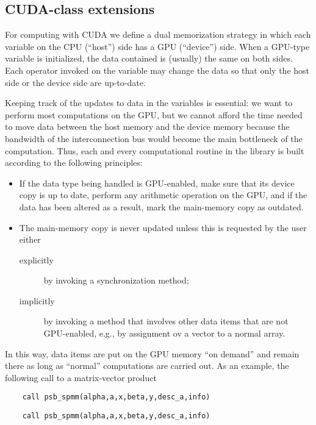 
\subsection{CUDA-class extensions}

For computing  with CUDA we define a dual memorization strategy in
which each variable on the CPU (``host'') side has a GPU (``device'')
side. When a GPU-type variable is initialized, the data contained is
(usually) the same on both sides. Each operator invoked on the
variable may change the data so that only the host side or the device
side are up-to-date. 

Keeping track of the updates to data in the variables  is essential: we want
to perform most  computations on the GPU, but we cannot afford the time
needed to move data between the host  memory and the device memory
because the bandwidth of the interconnection bus would become the main
bottleneck of the computation. Thus, each and every computational
routine in the library is built according to the following principles: 
\begin{itemize}
\item If the data type being handled is {GPU}-enabled, make sure that
  its device copy is up to date, perform any arithmetic operation on
  the {GPU}, and if the data has been altered as a result, mark
  the main-memory copy as outdated.
\item The main-memory copy is never updated unless this is requested
  by the user either 
\begin{description}
\item[explicitly] by invoking a synchronization method;
\item[implicitly] by invoking a method that involves other data items
  that are not {GPU}-enabled, e.g., by assignment ov a vector to a
  normal array. 
\end{description}
\end{itemize}
In this way, data items are put on the {GPU} memory ``on demand'' and
remain there as long as ``normal'' computations are carried out. 
As an example, the following call to a matrix-vector product
\ifpdf
\begin{verbatim}
    call psb_spmm(alpha,a,x,beta,y,desc_a,info)
\end{verbatim}
\else
\begin{center}
    \begin{minipage}[tl]{0.9\textwidth}
\begin{verbatim} 
    call psb_spmm(alpha,a,x,beta,y,desc_a,info)
\end{verbatim}
    \end{minipage}
  \end{center}
